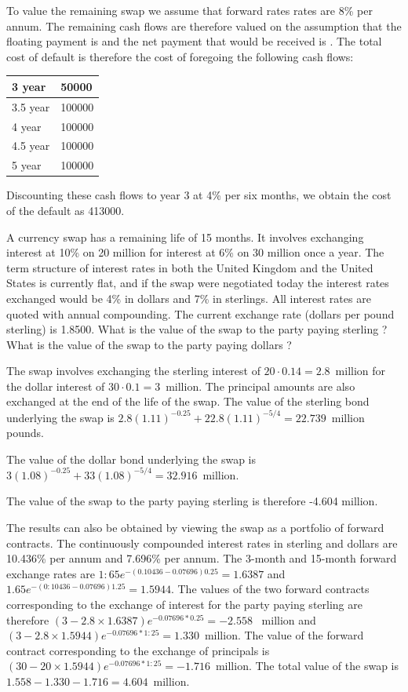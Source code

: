 \documentclass[12pt,a4paper]{exam}
\begin{document}
\begin{questions}
\begin{solution}
To value the remaining swap we assume that forward rates 
rates are 8\% per annum. The remaining cash flows are therefore valued on the assumption that the floating payment is and the net payment that would be received is . The
total cost of default is therefore the cost of foregoing the following cash flows:
\begin{center}
	\begin{tabular}{|l|l|}
	3 year & 50000 \\ \hline
	3.5 year & 100000 \\ \hline
	4 year &  100000 \\ \hline
	4.5 year & 100000 \\ \hline
	5 year & 100000 \\ \hline
	\end{tabular}
\end{center}
Discounting these cash flows to year 3 at 4\% per six months, we obtain the cost of the default as 413000.
\end{solution}

\question A currency swap has a remaining life of 15 months. It involves exchanging interest at 10\% on 20 million for interest at 6\% on 30 million once a year. The term structure of interest rates in both the United Kingdom and the United States is currently flat,
and if the swap were negotiated today the interest rates exchanged would be 4\% in dollars and 7\% in sterlings. All interest rates are quoted with annual compounding. The current exchange rate (dollars per pound sterling) is 1.8500. What is the value of the swap to the party paying sterling ? What is the value of the swap to the party paying dollars ?

\begin{solution}
The swap involves exchanging the sterling interest of $20\cdot 0.14 = 2.8$~million for the dollar interest of $30\cdot 0.1 = 3$~million. 
The principal amounts are also exchanged at the end of the life of the swap. The value of the sterling bond underlying the swap is
$2.8(1.11)^{-0.25} + 22.8(1.11)^{-5/4} = 22.739$~million pounds.

The value of the dollar bond underlying the swap is $3(1.08)^{-0.25} + 33(1.08)^{-5/4} = 32.916$~million.

The value of the swap to the party paying sterling is therefore
-4.604 million.

The results can also be obtained by viewing the swap as a portfolio of forward contracts. The continuously compounded interest rates in sterling and dollars are 10.436\% per annum and 7.696\% per annum. The 3-month and 15-month forward exchange rates are
$1:65e^{-(0.10436-0.07696)0.25}= 1.6387$ and $1.65e^{-(0:10436-0.07696)1.25} = 1.5944$.
The values of the two forward contracts corresponding to the exchange of interest for the party paying sterling are therefore
$(3-2.8\times  1.6387) e^{-0.07696*0.25} = -2.558$~ million
and $(3- 2.8\times  1.5944) e^{-0.07696*1:25} = 1.330$~million.
The value of the forward contract corresponding to the exchange of principals is $(30-20\times 1.5944) e^{-0.07696*1:25} = -1.716$~million.
The total value of the swap is $1.558-1.330-1.716 = 4.604$~million.
\end{solution}


\end{questions}
\end{document}
